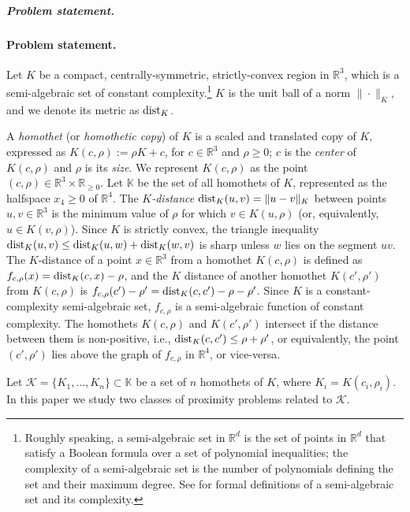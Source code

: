 \documentclass[11pt]{article}
\def\reals{{\mathbb R}}
\def\Kspace{{\mathbb K}}
\def\dist{{\rm dist}}
\def\K{\mathcal{K}}
\theoremstyle{definition}
\begin{document}
\ifsocgproc 
\subparagraph*{Problem statement.}
\else
\paragraph{Problem statement.}
\fi
Let $K$ be a compact, centrally-symmetric, strictly-convex region in $\reals^3$, which 
is a semi-algebraic set of constant complexity.\footnote{%
  Roughly speaking, a semi-algebraic set in $\reals^d$ is the set of points in $\reals^d$ that 
  satisfy a Boolean formula over a set of polynomial inequalities; the complexity of a semi-algebraic 
  set is the number of polynomials defining the set and their maximum degree.
  See \cite{BPR} for formal definitions of a semi-algebraic set and its complexity.}
$K$ is the unit ball of a norm
$\|\cdot\|_K$, and we denote its metric as $\dist_K$. 

A \emph{homothet} (or \emph{homothetic copy}) of $K$ is a scaled and translated copy of $K$, expressed as
$K(c,\rho) := \rho K + c$, for $c\in\reals^3$ and $\rho \ge 0$; $c$ is the \emph{center}
of $K(c,\rho)$ and $\rho$ is its \emph{size}. We represent $K(c,\rho)$ as the point 
$(c,\rho)\in\reals^3\times\reals_{\ge 0}$. Let $\Kspace$ be the set of all homothets of 
$K$, represented as the halfspace $x_4\ge 0$ of $\reals^4$.  
The \emph{$K$-distance} $\dist_K(u,v) = \|u-v\|_K$ between points $u,v\in\reals^3$
is the minimum value of $\rho$ for which 
$v\in K(u,\rho)$ (or, equivalently, $u\in K(v,\rho)$). Since $K$ is strictly convex, the 
triangle inequality $\dist_K(u,v) \le \dist_K(u,w) + \dist_K(w,v)$ is sharp unless $w$ lies 
on the segment $uv$.
The $K$-distance of a point $x\in\reals^3$ from a homothet $K(c,\rho)$ is defined as 
$f_{c,\rho}(x) = \dist_K(c,x)-\rho$, 
and the $K$ distance of another homothet $K(c',\rho')$ from $K(c,\rho)$ is $f_{c,\rho}(c')-\rho' = \dist_K(c,c')-\rho-\rho'$. 
Since $K$ is a constant-complexity semi-algebraic set, $f_{c,\rho}$ is 
a semi-algebraic function of constant complexity. 
The homothets $K(c,\rho)$ and $K(c',\rho')$ intersect if the distance between them is non-positive, 
i.e., $\dist_K(c,c') \le \rho+\rho'$, or equivalently, the point $(c',\rho')$ lies 
above the graph of $f_{c,\rho}$ in $\reals^4$, or vice-versa.

Let $\K=\{K_1, \ldots, K_n\} \subset \Kspace$ be a set of $n$ homothets of $K$, where 
$K_i=K(c_i,\rho_i)$. In this paper we study two classes of proximity problems related to $\K$.
\end{document}
